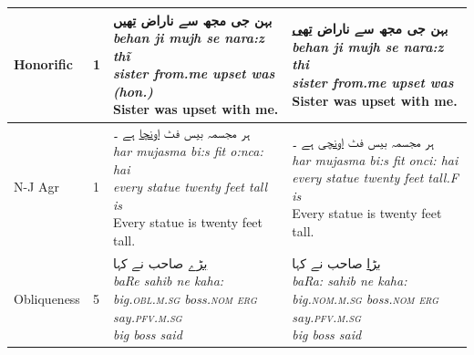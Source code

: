 \documentclass[11pt]{article}
\begin{document}
\begin{table}[ht!]
{\begin{tabular}{llp{9cm}p{9cm}}
Honorific & 1 & 
\parbox[t]{9cm}{\foreignlanguage{arabic}{ بہن جی مجھ سے ناراض \underline{تھیں} }\\
\textit{behan ji mujh se nara:z th\~{i}} \\
\textit{sister from.me upset was (hon.)} \\
Sister was upset with me.}
& 
\parbox[t]{9cm}{\foreignlanguage{arabic}{ بہن جی مجھ سے ناراض \underline{تھی}} \\
\textit{behan ji mujh se nara:z thi} \\
\textit{sister from.me upset was} \\
Sister was upset with me.} \\
\hline
N-J Agr & 1 & 
\parbox[t]{9cm}{\foreignlanguage{arabic}{ ہر مجسمہ بیس فٹ \underline{اونچا} ہے ۔} \\
\textit{har mujasma bi:s fit o:nca: hai} \\
\textit{every statue twenty feet tall is} \\
Every statue is twenty feet tall.}
& 
\parbox[t]{9cm}{\foreignlanguage{arabic}{ ہر مجسمہ بیس فٹ \underline{اونچی} ہے ۔} \\
\textit{har mujasma bi:s fit onci: hai} \\
\textit{every statue twenty feet tall.F is} \\
Every statue is twenty feet tall.} \\
\hline
Obliqueness& 5 &\parbox[t]{9cm}{\foreignlanguage{arabic}{\underline{بڑے} صاحب نے کہا}\\
\textit{baRe sahib ne kaha:}\\
\textit {big.\textsc{obl.m.sg} boss.\textsc{nom} \textsc{erg} say.\textsc{pfv.m.sg} }\\
\textit{big boss said}

} & 
\parbox[t]{9cm}{
\foreignlanguage{arabic}{\underline{بڑا} صاحب نے کہا}\\
\textit{baRa: sahib ne kaha:}\\
\textit{ big.\textsc{nom.m.sg} boss.\textsc{nom} \textsc{erg} say.\textsc{pfv.m.sg}}
\\
\textit{big boss said}} 
\\


\end{tabular}}
\end{table}
\end{document}
